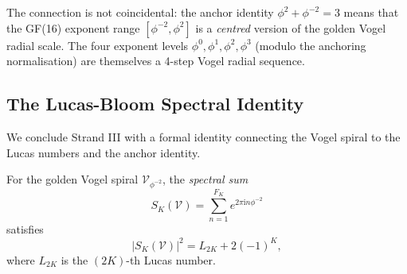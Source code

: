 The connection is not coincidental: the anchor identity
$\phi^2 + \phi^{-2} = 3$ means that the GF(16) exponent range
$[\phi^{-2}, \phi^2]$ is a \emph{centred} version of the golden Vogel
radial scale.  The four exponent levels $\phi^0, \phi^1, \phi^2, \phi^3$
(modulo the anchoring normalisation) are themselves a 4-step Vogel
radial sequence.

\subsection{The Lucas-Bloom Spectral Identity}
\label{subsec:lucas-bloom}

We conclude Strand III with a formal identity connecting the Vogel
spiral to the Lucas numbers and the anchor identity.

\begin{theorem}\label{thm:lucas-bloom}
For the golden Vogel spiral $\mathcal{V}_{\phi^{-2}}$, the
\emph{spectral sum}
\[
  S_K(\mathcal{V}) = \sum_{n=1}^{F_K} e^{2\pi \mathrm{i} n \phi^{-2}}
\]
satisfies
\[
  |S_K(\mathcal{V})|^2 = L_{2K} + 2(-1)^K,
\]
where $L_{2K}$ is the $(2K)$-th Lucas number.
\end{theorem}

